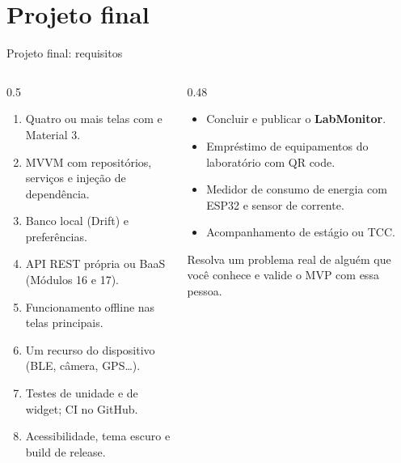 \documentclass[aspectratio=169,10pt]{beamer}
\begin{document}
\section{Projeto final}

\begin{frame}{Projeto final: requisitos}
  \begin{columns}[T]
    \begin{column}{0.5\textwidth}
      \begin{conceito}
        \begin{enumerate}
          \item Quatro ou mais telas com  e Material 3.
          \item MVVM com repositórios, serviços e injeção de dependência.
          \item Banco local (Drift) e preferências.
          \item API REST própria ou BaaS (Módulos 16 e 17).
          \item Funcionamento offline nas telas principais.
          \item Um recurso do dispositivo (BLE, câmera, GPS\ldots).
          \item Testes de unidade e de widget; CI no GitHub.
          \item Acessibilidade, tema escuro e build de release.
        \end{enumerate}
      \end{conceito}
    \end{column}
    \begin{column}{0.48\textwidth}
      \begin{projeto}
        \begin{itemize}
          \item Concluir e publicar o \textbf{LabMonitor}.
          \item Empréstimo de equipamentos do laboratório com QR code.
          \item Medidor de consumo de energia com ESP32 e sensor de corrente.
          \item Acompanhamento de estágio ou TCC.
        \end{itemize}
      \end{projeto}
      \begin{dica}
        Resolva um problema real de alguém que você conhece e valide o MVP com essa pessoa.
      \end{dica}
    \end{column}
  \end{columns}
\end{frame}
\end{document}
